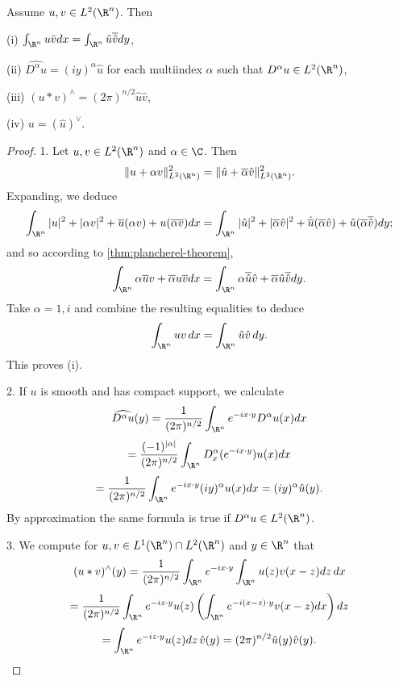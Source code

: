 \begin{theorem}
\label{thm:fourier-transform-properties}
Assume $u, v \in L^2(\R^n)$. Then

(i) $\int_{\R^n} u\bar{v} dx = \int_{\R^n} \hat{u}\overline{\hat{v}} dy$,

(ii) $\widehat{D^\alpha u} = (iy)^\alpha \hat{u}$ for each multiindex $\alpha$ such that $D^\alpha u \in L^2(\R^n)$,

(iii) $(u * v)^\wedge = (2\pi)^{n/2}\hat{u}\hat{v}$,

(iv) $u = (\hat{u})^\vee$.
\end{theorem}
\begin{proof}
1. Let $u, v \in L^2(\R^n)$ and $\alpha \in \C$. Then
$$\|u + \alpha v\|^2_{L^2(\R^n)} = \|\hat{u} + \overline{\alpha}\hat{v}\|^2_{L^2(\R^n)}.$$
Expanding, we deduce
$$\int_{\R^n} |u|^2 + |\alpha v|^2 + \overline{u}(\alpha v) + u(\overline{\alpha}\overline{v}) dx = \int_{\R^n} |\hat{u}|^2 + |\overline{\alpha}\hat{v}|^2 + \hat{\overline{u}}(\overline{\alpha}\hat{v}) + \hat{u}(\overline{\alpha}\overline{\hat{v}}) dy;$$
and so according to \cref{thm:plancherel-theorem},
$$\int_{\R^n} \alpha\overline{u}v + \overline{\alpha}u\overline{v} dx = \int_{\R^n} \alpha\overline{\hat{u}}\hat{v} + \overline{\alpha}\hat{u}\overline{\hat{v}} dy.$$
Take $\alpha = 1, i$ and combine the resulting equalities to deduce
$$\int_{\R^n} uv \, dx = \int_{\R^n} \hat{u}\hat{v} \, dy.$$
This proves (i).

2. If $u$ is smooth and has compact support, we calculate
$$\widehat{D^\alpha u}(y) = \frac{1}{(2\pi)^{n/2}} \int_{\R^n} e^{-ix \cdot y} D^\alpha u(x) dx$$
$$= \frac{(-1)^{|\alpha|}}{(2\pi)^{n/2}} \int_{\R^n} D^\alpha_x(e^{-ix \cdot y})u(x) dx$$
$$= \frac{1}{(2\pi)^{n/2}} \int_{\R^n} e^{-ix \cdot y}(iy)^\alpha u(x) dx = (iy)^\alpha \hat{u}(y).$$
By approximation the same formula is true if $D^\alpha u \in L^2(\R^n)$.

3. We compute for $u, v \in L^1(\R^n) \cap L^2(\R^n)$ and $y \in \R^n$ that
$$(u * v)^\wedge(y) = \frac{1}{(2\pi)^{n/2}} \int_{\R^n} e^{-ix \cdot y} \int_{\R^n} u(z)v(x - z) dz \, dx$$
$$= \frac{1}{(2\pi)^{n/2}} \int_{\R^n} e^{-iz \cdot y}u(z) \left(\int_{\R^n} e^{-i(x-z) \cdot y}v(x - z) dx\right) dz$$
$$= \int_{\R^n} e^{-iz \cdot y}u(z) dz \, \hat{v}(y) = (2\pi)^{n/2}\hat{u}(y)\hat{v}(y).$$


\end{proof}
